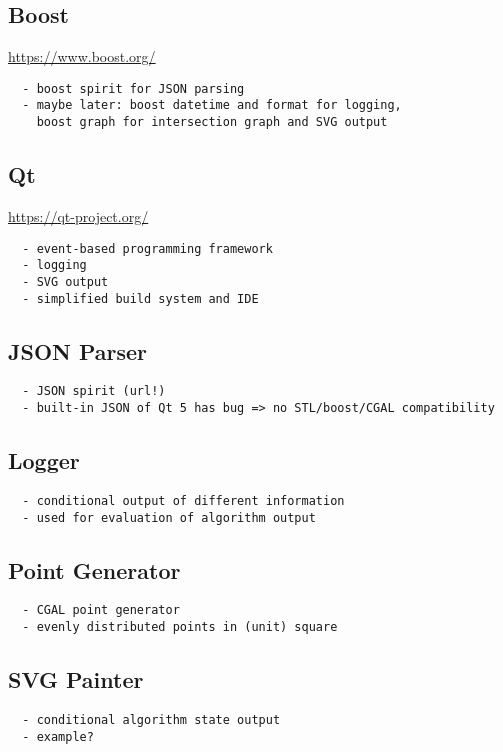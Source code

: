 \subsection{Boost}
\url{https://www.boost.org/}
\begin{verbatim}
  - boost spirit for JSON parsing
  - maybe later: boost datetime and format for logging, 
    boost graph for intersection graph and SVG output
\end{verbatim}

\subsection{Qt}\label{sec:Qt}
\url{https://qt-project.org/}
\begin{verbatim}
  - event-based programming framework
  - logging
  - SVG output
  - simplified build system and IDE
\end{verbatim}

\subsection{JSON Parser}
\begin{verbatim}
  - JSON spirit (url!)
  - built-in JSON of Qt 5 has bug => no STL/boost/CGAL compatibility
\end{verbatim}

\subsection{Logger}
\begin{verbatim}
  - conditional output of different information
  - used for evaluation of algorithm output
\end{verbatim}

\subsection{Point Generator}
\begin{verbatim}
  - CGAL point generator
  - evenly distributed points in (unit) square
\end{verbatim}

\subsection{SVG Painter}\label{sec:svg_painter}
\begin{verbatim}
  - conditional algorithm state output
  - example?
\end{verbatim}
